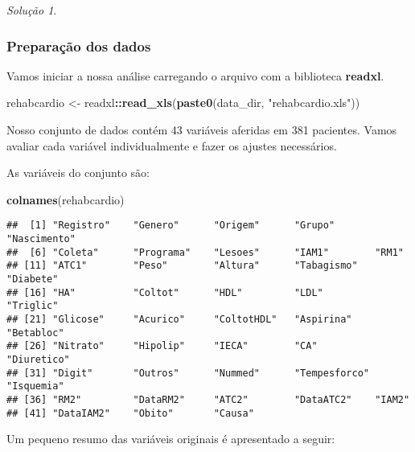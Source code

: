 \documentclass[
]{latex/krantz}
\newenvironment{Shaded}{\begin{snugshade}}{\end{snugshade}}
\newcommand{\FunctionTok}[1]{\textcolor[rgb]{0.13,0.29,0.53}{\textbf{#1}}}
\newcommand{\NormalTok}[1]{#1}
\newcommand{\OtherTok}[1]{\textcolor[rgb]{0.56,0.35,0.01}{#1}}
\newcommand{\SpecialCharTok}[1]{\textcolor[rgb]{0.81,0.36,0.00}{\textbf{#1}}}
\newcommand{\StringTok}[1]{\textcolor[rgb]{0.31,0.60,0.02}{#1}}
\theoremstyle{definition}
\theoremstyle{definition}
\theoremstyle{definition}
\theoremstyle{definition}
\theoremstyle{remark}
\newtheorem*{solution}{Solução}
\begin{document}
\begin{solution}
\leavevmode

\hypertarget{preparauxe7uxe3o-dos-dados-1}{%
\subsubsection*{Preparação dos dados}\label{preparauxe7uxe3o-dos-dados-1}}

Vamos iniciar a nossa análise carregando o arquivo com a biblioteca \textbf{readxl}.

\begin{Shaded}
\begin{Highlighting}[]
\NormalTok{rehabcardio }\OtherTok{\textless{}{-}}\NormalTok{ readxl}\SpecialCharTok{::}\FunctionTok{read\_xls}\NormalTok{(}\FunctionTok{paste0}\NormalTok{(data\_dir, }\StringTok{"rehabcardio.xls"}\NormalTok{))}
\end{Highlighting}
\end{Shaded}

Nosso conjunto de dados contém 43 variáveis aferidas em 381 pacientes. Vamos avaliar cada variável individualmente e fazer os ajustes necessários.

As variáveis do conjunto são:

\begin{Shaded}
\begin{Highlighting}[]
\FunctionTok{colnames}\NormalTok{(rehabcardio)}
\end{Highlighting}
\end{Shaded}

\begin{verbatim}
##  [1] "Registro"    "Genero"      "Origem"      "Grupo"       "Nascimento" 
##  [6] "Coleta"      "Programa"    "Lesoes"      "IAM1"        "RM1"        
## [11] "ATC1"        "Peso"        "Altura"      "Tabagismo"   "Diabete"    
## [16] "HA"          "Coltot"      "HDL"         "LDL"         "Triglic"    
## [21] "Glicose"     "Acurico"     "ColtotHDL"   "Aspirina"    "Betabloc"   
## [26] "Nitrato"     "Hipolip"     "IECA"        "CA"          "Diuretico"  
## [31] "Digit"       "Outros"      "Nummed"      "Tempesforco" "Isquemia"   
## [36] "RM2"         "DataRM2"     "ATC2"        "DataATC2"    "IAM2"       
## [41] "DataIAM2"    "Obito"       "Causa"
\end{verbatim}

Um pequeno resumo das variáveis originais é apresentado a seguir:


\end{solution}
\end{document}
